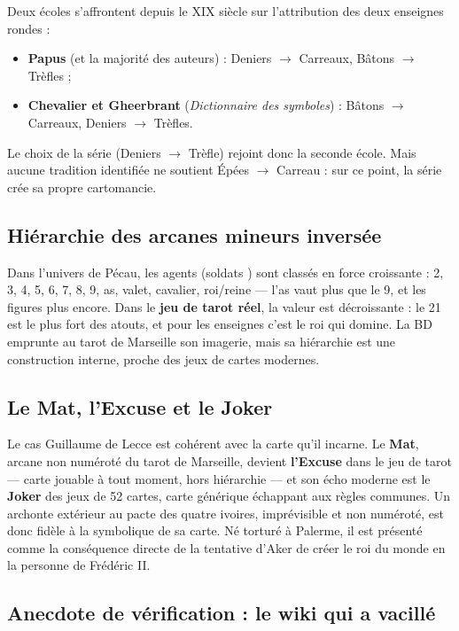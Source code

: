 \documentclass[11pt,a5paper]{article}
\begin{document}
Deux écoles s'affrontent depuis le XIX\ieme{} siècle sur l'attribution des
deux enseignes \og rondes \fg{} :
\begin{itemize}
\item \textbf{Papus} (et la majorité des auteurs) : Deniers $\rightarrow$
Carreaux, Bâtons $\rightarrow$ Trèfles ;
\item \textbf{Chevalier et Gheerbrant} (\emph{Dictionnaire des symboles}) :
Bâtons $\rightarrow$ Carreaux, Deniers $\rightarrow$ Trèfles.
\end{itemize}
Le choix de la série (Deniers $\rightarrow$ Trèfle) rejoint donc la seconde
école. Mais aucune tradition identifiée ne soutient
Épées $\rightarrow$ Carreau : sur ce point, la série crée sa propre
cartomancie.

\clearpage

\subsection{Hiérarchie des arcanes mineurs inversée}

Dans l'univers de Pécau, les agents (\og soldats \fg{}) sont classés en
force croissante : 2, 3, 4, 5, 6, 7, 8, 9, as, valet, cavalier, roi/reine
--- l'as vaut plus que le 9, et les figures plus encore. Dans le
\textbf{jeu de tarot réel}, la valeur est décroissante : le 21 est le plus
fort des atouts, et pour les enseignes c'est le roi qui domine. La BD
emprunte au tarot de Marseille son imagerie, mais sa hiérarchie est une
construction interne, proche des jeux de cartes modernes.

\subsection{Le Mat, l'Excuse et le Joker}

Le cas Guillaume de Lecce est cohérent avec la carte qu'il incarne. Le
\textbf{Mat}, arcane non numéroté du tarot de Marseille, devient
\textbf{l'Excuse} dans le jeu de tarot --- carte jouable à tout moment, hors
hiérarchie --- et son écho moderne est le \textbf{Joker} des jeux de
52 cartes, carte \og générique \fg{} échappant aux règles communes. Un
archonte extérieur au pacte des quatre ivoires, imprévisible et non
numéroté, est donc fidèle à la symbolique de sa carte. Né torturé à
Palerme, il est présenté comme la \og conséquence directe \fg{} de la
tentative d'Aker de créer le \og roi du monde \fg{} en la personne de
Frédéric II.

\subsection{Anecdote de vérification : le wiki qui a vacillé}
\end{document}

